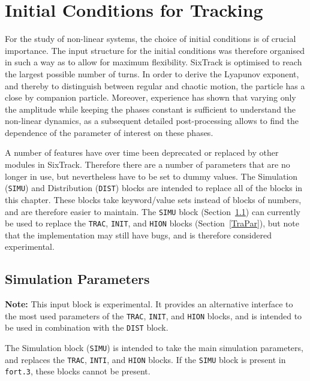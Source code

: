 
\chapter{Initial Conditions for Tracking} \label{InitCondTrack}

For the study of non-linear systems, the choice of initial conditions is of crucial importance.
The input structure for the initial conditions was therefore organised in such a way as to allow for maximum flexibility.
SixTrack is optimised to reach the largest possible number of turns.
In order to derive the Lyapunov exponent, and thereby to distinguish between regular and chaotic motion, the particle has a close by companion particle.
Moreover, experience has shown that varying only the amplitude while keeping the phases constant is sufficient to understand the non-linear dynamics, as a subsequent detailed post-processing allows to find the dependence of the parameter of interest on these phases.

A number of features have over time been deprecated or replaced by other modules in SixTrack.
Therefore there are a number of parameters that are no longer in use, but nevertheless have to be set to dummy values.
The Simulation (\texttt{SIMU}) and Distribution (\texttt{DIST}) blocks are intended to replace all of the blocks in this chapter.
These blocks take keyword/value sets instead of blocks of numbers, and are therefore easier to maintain.
The \texttt{SIMU} block (Section~\ref{Input:SIMU}) can currently be used to replace the \texttt{TRAC}, \texttt{INIT}, and \texttt{HION} blocks (Section~\ref{TraPar}), but note that the implementation may still have bugs, and is therefore considered experimental.

\section{Simulation Parameters} \label{Input:SIMU}

\textcolor{notered}{\textbf{Note:} This input block is experimental. It provides an alternative interface to the most used parameters of the \texttt{TRAC}, \texttt{INIT}, and \texttt{HION} blocks, and is intended to be used in combination with the \texttt{DIST} block.}

\bigskip
The Simulation block (\texttt{SIMU}) is intended to take the main simulation parameters, and replaces the \texttt{TRAC}, \texttt{INTI}, and \texttt{HION} blocks.
If the \texttt{SIMU} block is present in \texttt{fort.3}, these blocks cannot be present.

